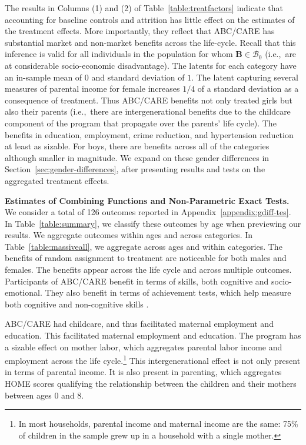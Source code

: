 The results in  Columns (1) and (2) of Table~\ref{table:treatfactors} indicate that accounting for baseline controls and attrition has little effect on the estimates of the treatment effects. More importantly, they reflect that ABC/CARE has substantial market and non-market benefits across the life-cycle. Recall that this inference is valid for all individuals in the population for whom $\bm{B} \in \mathcal{B}_0$ (i.e.,\ are at considerable socio-economic disadvantage). The latents for each category have an in-sample mean of $0$ and standard deviation of $1$. The latent capturing several measures of parental income for female increases $1/4$ of a standard deviation as a consequence of treatment. Thus ABC/CARE benefits not only treated girls but also their parents (i.e.,\ there are intergenerational benefits due to the childcare component of the program that propagate over the parents' life cycle). The benefits in education, employment, crime reduction, and hypertension reduction at least as sizable. For boys, there are benefits across all of the categories although smaller in magnitude. We expand on these gender differences in Section~\ref{sec:gender-differences}, after presenting results and tests on the aggregated treatment effects.

\textbf{Estimates of Combining Functions and Non-Parametric Exact Tests.} We consider a total of 126 outcomes reported in Appendix~\ref{appendix:gdiff-tes}. In Table~\ref{table:summary}, we classify these outcomes by age when previewing our results. We aggregate outcomes within ages and across categories. In Table~\ref{table:massiveall}, we aggregate across ages and within categories. The benefits of random assignment to treatment are noticeable for both males and females. The benefits appear across the life cycle and across multiple outcomes. Participants of ABC/CARE benefit in terms of skills, both cognitive and socio-emotional. They also benefit in terms of achievement tests, which help measure both cognitive and non-cognitive skills \citep{Almlund_Duckworth_etal_2011_ecoval}.

ABC/CARE had childcare, and thus facilitated maternal employment and education. This facilitated maternal employment and education. The program has a sizable effect on mother labor, which aggregates parental labor income and employment across the life cycle.\footnote{In most households, parental income and maternal income are the same: 75\% of children in the sample grew up in a household with a single mother.} This intergenerational effect is not only present in terms of parental income. It is also present in parenting, which aggregates HOME scores qualifying the relationship between the children and their mothers between ages 0 and 8.

